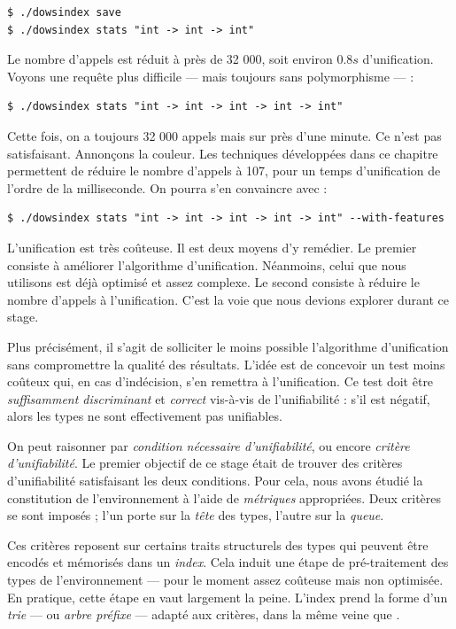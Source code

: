 \documentclass[a4paper]{report}
\theoremstyle{definition}
\begin{document}
\begin{verbatim}
$ ./dowsindex save
$ ./dowsindex stats "int -> int -> int"
\end{verbatim}

Le nombre d'appels est réduit à près de 32 000, soit environ $0.8s$ d'unification. Voyons une requête plus difficile — mais toujours sans polymorphisme — :

\begin{verbatim}
$ ./dowsindex stats "int -> int -> int -> int -> int"
\end{verbatim}

Cette fois, on a toujours 32 000 appels mais sur près d'une minute. Ce n'est pas satisfaisant. Annonçons la couleur. Les techniques développées dans ce chapitre permettent de réduire le nombre d'appels à 107, pour un temps d'unification de l'ordre de la milliseconde. On pourra s'en convaincre avec :

\begin{verbatim}
$ ./dowsindex stats "int -> int -> int -> int -> int" --with-features
\end{verbatim}

L'unification est très coûteuse. Il est deux moyens d'y remédier. Le premier consiste à améliorer l'algorithme d'unification. Néanmoins, celui que nous utilisons est déjà optimisé et assez complexe. Le second consiste à réduire le nombre d'appels à l'unification. C'est la voie que nous devions explorer durant ce stage.

Plus précisément, il s'agit de solliciter le moins possible l'algorithme d'unification sans compromettre la qualité des résultats. L'idée est de concevoir un test moins coûteux qui, en cas d'indécision, s'en remettra à l'unification. Ce test doit être \emph{suffisamment discriminant} et \emph{correct} vis-à-vis de l'unifiabilité : s'il est négatif, alors les types ne sont effectivement pas unifiables.

On peut raisonner par \emph{condition nécessaire d'unifiabilité}, ou encore \emph{critère d'unifiabilité}. Le premier objectif de ce stage était de trouver des critères d'unifiabilité satisfaisant les deux conditions. Pour cela, nous avons étudié la constitution de l'environnement à l'aide de \emph{métriques} appropriées. Deux critères se sont imposés ; l'un porte sur la \emph{tête} des types, l'autre sur la \emph{queue}.

Ces critères reposent sur certains traits structurels des types qui peuvent être encodés et mémorisés dans un \emph{index}. Cela induit une étape de pré-traitement des types de l'environnement — pour le moment assez coûteuse mais non optimisée. En pratique, cette étape en vaut largement la peine. L'index prend la forme d'un \emph{trie} — ou \emph{arbre préfixe} — adapté aux critères, dans la même veine que \cite{Schulz}.
\end{document}
